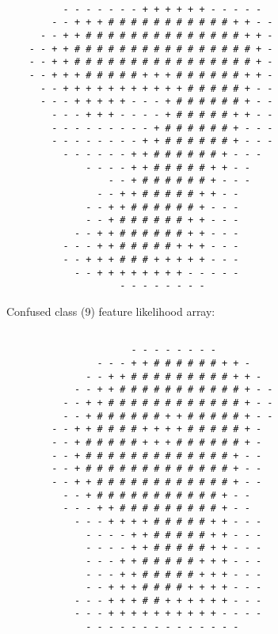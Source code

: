 \begin{multicols*}{2}
\begin{Verbatim}[samepage=true]
                                                        
          - - - - - - - + + + + + + - - - - -           
        - - + + + # # # # # # # # # # # + + - -         
      - - + + # # # # # # # # # # # # # # + + -         
    - - + + # # # # # # # # # # # # # # # # + -         
    - - + + # # # # # # # # # # # # # # # # + -         
    - - + + + # # # # # + + + # # # # # # + + -         
      - - + + + + + + + + + + + # # # # # + - -         
      - - - + + + + + - - - + # # # # # # + - -         
        - - - + + + - - - - + # # # # # + + - -         
        - - - - - - - - - + # # # # # # + - - -         
        - - - - - - - - + + # # # # # # + - - -         
          - - - - - - + + # # # # # # + - - -           
              - - - - + + # # # # # + + - -             
                  - - + # # # # # # + - - -             
                - - + + # # # # # + + - -               
              - - + + # # # # # # + - - -               
              - - + # # # # # # + + - - -               
            - - + + # # # # # # + + - - -               
          - - - + + # # # # # + + + - - -               
          - - + + + # # # + + + + + - - -               
            - - + + + + + + + + - - - - -               
                    - - - - - - - -                     
\end{Verbatim}
\newpage
Confused class (9) feature likelihood array:
\begin{Verbatim}[samepage=true]
                                                        
                      - - - - - - - -                   
                - - - + + # # # # # # + + -             
              - - + + # # # # # # # # # + + -           
            - - + + # # # # # # # # # # # + - -         
          - - + + # # # # # # # # # # # # + - -         
          - - + # # # # # # + + # # # # # + - -         
        - - + + # # # # + + + + # # # # # + -           
        - - + # # # # # + + + # # # # # # + -           
        - - + # # # # # # # # # # # # # + - -           
        - - + # # # # # # # # # # # # # + - -           
        - - + + # # # # # # # # # # # # + - -           
          - - + # # # # # # # # # # # + - -             
          - - - + + # # # # # # # # # + - -             
            - - - + + + + # # # # # + + - - -           
              - - - - + + # # # # # + + - - -           
              - - - - + + # # # # # + + - - -           
              - - - + + # # # # # + + + - - -           
              - - - + + # # # # # + + + - - -           
              - - + + + # # # # + + + + - - -           
            - - - + + + # # + + + + + + - - -           
            - - - + + + + + + + + + + - - - -           
              - - - - - - - - - - - - - -               
                                                        

\end{Verbatim}
\end{multicols*}
